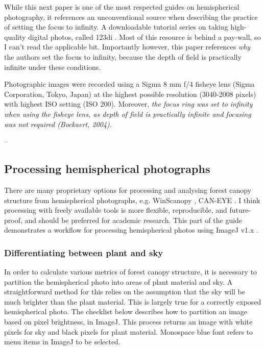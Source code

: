 \documentclass[11pt,a4paper]{article}
\begin{document}
While this next paper is one of the most respected guides on hemispherical photography, it references an unconventional source when describing the practice of setting the focus to infinity. A downloadable tutorial series on taking high-quality digital photos, called 123di \citep{123di}. Most of this resource is behind a pay-wall, so I can't read the applicable bit. Importantly however, this paper references \textit{why} the authors set the focus to infinity, because the depth of field is practically infinite under these conditions.

\begin{minipage}{\linewidth}
\begin{framed}
Photographic images were recorded using a Sigma 8 mm f/4 fisheye lens (Sigma Corporation, Tokyo, Japan) at the highest possible resolution (3040-2008 pixels) with highest ISO setting (ISO 200). Moreover, \textit{the focus ring was set to infinity when using the fisheye lens, as depth of field is practically infinite and focusing was not required (Bockaert, 2004).}

-- \citealt{Jonckheere2005}
\end{framed}
\end{minipage}

\subsection{Processing hemispherical photographs}

There are many proprietary options for processing and analysing forest canopy structure from hemispherical photographs, e.g. WinScanopy \citep{WinScanopy}, CAN-EYE \citep{CAN-EYE}. I think processing with freely available tools is more flexible, reproducible, and future-proof, and should be preferred for academic research. This part of the guide demonstrates a workflow for processing hemispherical photos using ImageJ v1.x \citep{Schneider2012}.

\subsubsection{Differentiating between plant and sky}

In order to calculate various metrics of forest canopy structure, it is necessary to partition the hemispherical photo into areas of plant material and sky. A straightforward method for this relies on the assumption that the sky will be much brighter than the plant material. This is largely true for a correctly exposed hemispherical photo. The checklist below describes how to partition an image based on pixel brightness, in ImageJ. This process returns an image with white pixels for sky and black pixels for plant material. Monospace blue font refers to menu items in ImageJ to be selected.
\end{document}
